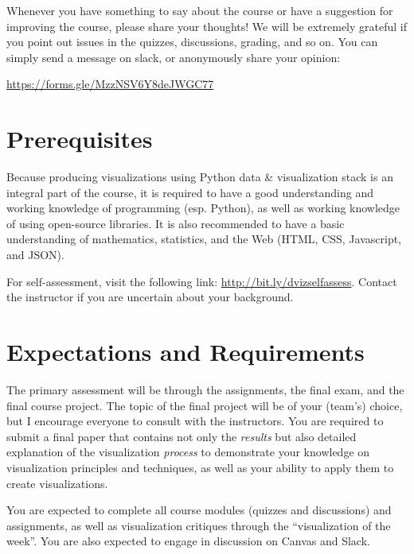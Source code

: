 \documentclass[11pt,article,oneside]{memoir} %
\begin{document}
Whenever you have something to say about the course or have a suggestion for improving the course, please share your thoughts! We will be extremely grateful if you point out issues in the quizzes, discussions, grading, and so on. You can simply send a message on slack, or anonymously share your opinion:

\url{https://forms.gle/MzzNSV6Y8deJWGC77} 

\section{Prerequisites}%
\label{sec:Prerequisites}

Because producing visualizations using Python data \& visualization stack is an integral part of the course, it is required to have a good understanding and working knowledge of programming (esp. Python), as well as working knowledge of using open-source libraries. 
It is also recommended to have a basic understanding of mathematics, statistics, and the Web (HTML, CSS, Javascript, and JSON). 

For self-assessment, visit the following link: \href{http://bit.ly/dvizselfassess}{http://bit.ly/dvizselfassess}. 
Contact the instructor if you are uncertain about your background. 

\section{Expectations and Requirements}%
\label{sec:requirements}

The primary assessment will be through the assignments, the final exam, and the final course project. 
The topic of the final project will be of your (team's) choice, but I encourage everyone to consult with the instructors. 
You are required to submit a final paper that contains not only the \emph{results} but also detailed explanation of the visualization \emph{process} to demonstrate your knowledge on visualization principles and techniques, as well as your ability to apply them to create visualizations. 

You are expected to complete all course modules (quizzes and discussions) and assignments, as well as visualization critiques through the ``visualization of the week''. You are also expected to engage in discussion on Canvas and Slack. 
\end{document}
